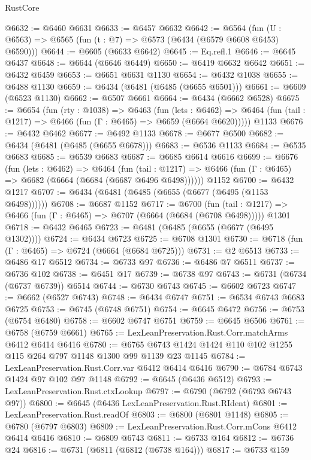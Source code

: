 \begin{lexlean}{RustCore}
\begin{coremodule}
@6632 := @6460 @6631
@6633 := @6457 @6632
@6642 := @6564 (fun (U : @6563) => @6565 (fun (t : @7) => @6573 (@6434 (@6579 @6608 @6453) @6590)))
@6644 := @6605 (@6633 @6642)
@6645 := Eq.refl.{1}
@6646 := @6645 @6437
@6648 := @6644 (@6646 @6449)
@6650 := @6419 @6632 @6642
@6651 := @6432 @6459
@6653 := @6651 @6631 @1130
@6654 := @6432 @1038
@6655 := @6488 @1130
@6659 := @6434 (@6481 (@6485 (@6655 @6501)))
@6661 := @6609 (@6523 @1130)
@6662 := @6507 @6661
@6664 := @6434 (@6662 @6528)
@6675 := @6654
    (fun (rty : @1038) =>
    @6463
      (fun (lets : @6462) =>
      @6464 (fun (tail : @1217) => @6466 (fun (Γ : @6465) => @6659 (@6664 @6620)))))
    @1133
@6676 := @6432 @6462
@6677 := @6492 @1133
@6678 := @6677 @6500
@6682 := @6434 (@6481 (@6485 (@6655 @6678)))
@6683 := @6536 @1133
@6684 := @6535 @6683
@6685 := @6539 @6683
@6687 := @6685 @6614 @6616
@6699 := @6676
    (fun (lets : @6462) =>
    @6464
      (fun (tail : @1217) => @6466 (fun (Γ : @6465) => @6682 (@6664 (@6684 (@6687 @6496 @6498))))))
    @1152
@6700 := @6432 @1217
@6707 := @6434 (@6481 (@6485 (@6655 (@6677 (@6495 (@1153 @6498))))))
@6708 := @6687 @1152
@6717 := @6700
    (fun (tail : @1217) => @6466 (fun (Γ : @6465) => @6707 (@6664 (@6684 (@6708 @6498)))))
    @1301
@6718 := @6432 @6465
@6723 := @6481 (@6485 (@6655 (@6677 (@6495 @1302))))
@6724 := @6434 @6723
@6725 := @6708 @1301
@6730 := @6718 (fun (Γ : @6465) => @6724 (@6664 (@6684 @6725)))
@6731 := @2 @6513
@6733 := @6486 @17 @6512
@6734 := @6733 @97
@6736 := @6486 @7 @6511
@6737 := @6736 @102
@6738 := @6451 @17
@6739 := @6738 @97
@6743 := @6731 (@6734 (@6737 @6739)) @6514
@6744 := @6730 @6743
@6745 := @6602 @6723
@6747 := @6662 (@6527 @6743)
@6748 := @6434 @6747
@6751 := @6534 @6743 @6683 @6725
@6753 := @6745 (@6748 @6751)
@6754 := @6645 @6472
@6756 := @6753 (@6754 @6480)
@6758 := @6602 @6747 @6751
@6759 := @6645 @6506
@6761 := @6758 (@6759 @6661)
@6765 := LexLeanPreservation.Rust.Corr.matchArms @6412 @6414 @6416
@6780 := @6765 @6743 @1424 @1424 @110 @102 @1255 @115 @264 @797 @1148 @1300 @99 @1139 @23 @1145
@6784 := LexLeanPreservation.Rust.Corr.var @6412 @6414 @6416
@6790 := @6784 @6743 @1424 @97 @102 @97 @1148
@6792 := @6645 (@6436 @6512)
@6793 := LexLeanPreservation.Rust.ctxLookup
@6797 := @6790 (@6792 (@6793 @6743 @97))
@6800 := @6645 (@6436 LexLeanPreservation.Rust.RIdent)
@6801 := LexLeanPreservation.Rust.readOf
@6803 := @6800 (@6801 @1148)
@6805 := @6780 (@6797 @6803)
@6809 := LexLeanPreservation.Rust.Corr.mCons @6412 @6414 @6416
@6810 := @6809 @6743
@6811 := @6733 @164
@6812 := @6736 @24
@6816 := @6731 (@6811 (@6812 (@6738 @164)))
@6817 := @6733 @159

\end{coremodule}
\end{lexlean}
